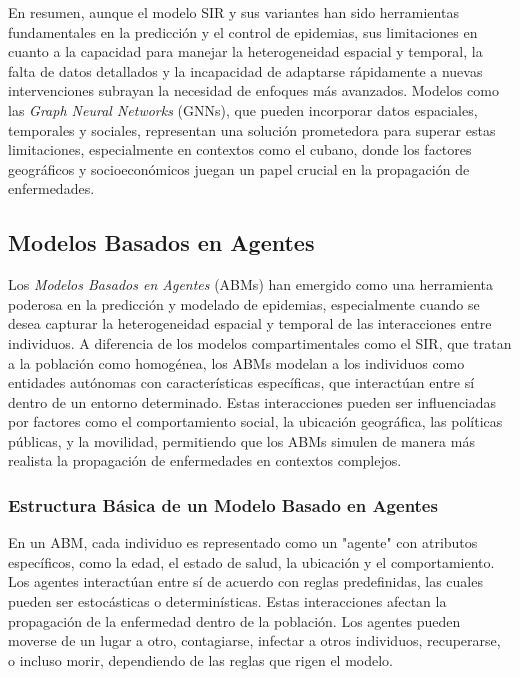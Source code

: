 En resumen, aunque el modelo SIR y sus variantes han sido herramientas fundamentales en la predicción y el control de epidemias, sus limitaciones en cuanto a la capacidad para manejar la heterogeneidad espacial y temporal, la falta de datos detallados y la incapacidad de adaptarse rápidamente a nuevas intervenciones subrayan la necesidad de enfoques más avanzados. Modelos como las \textit{Graph Neural Networks} (GNNs), que pueden incorporar datos espaciales, temporales y sociales, representan una solución prometedora para superar estas limitaciones, especialmente en contextos como el cubano, donde los factores geográficos y socioeconómicos juegan un papel crucial en la propagación de enfermedades.

\subsection{Modelos Basados en Agentes}\label{section:agent-based-models}

Los \textit{Modelos Basados en Agentes} (ABMs) han emergido como una herramienta poderosa en la predicción y modelado de epidemias, especialmente cuando se desea capturar la heterogeneidad espacial y temporal de las interacciones entre individuos. A diferencia de los modelos compartimentales como el SIR, que tratan a la población como homogénea, los ABMs modelan a los individuos como entidades autónomas con características específicas, que interactúan entre sí dentro de un entorno determinado. Estas interacciones pueden ser influenciadas por factores como el comportamiento social, la ubicación geográfica, las políticas públicas, y la movilidad, permitiendo que los ABMs simulen de manera más realista la propagación de enfermedades en contextos complejos.

\subsubsection{Estructura Básica de un Modelo Basado en Agentes}

En un ABM, cada individuo es representado como un "agente" con atributos específicos, como la edad, el estado de salud, la ubicación y el comportamiento. Los agentes interactúan entre sí de acuerdo con reglas predefinidas, las cuales pueden ser estocásticas o determinísticas. Estas interacciones afectan la propagación de la enfermedad dentro de la población. Los agentes pueden moverse de un lugar a otro, contagiarse, infectar a otros individuos, recuperarse, o incluso morir, dependiendo de las reglas que rigen el modelo.

